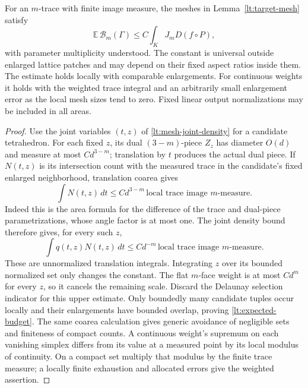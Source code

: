 \begin{lemma}
\label{lt:budget-expectation}
For an $m$-trace with finite image measure, the meshes in
Lemma~\ref{lt:target-mesh} satisfy
\begin{equation}
 \mathbb E\,\mathcal B_m(\Gamma)
             \leq C\int_K J_mD(f\circ P),
 \label{lt:expected-budget}
\end{equation}
with parameter multiplicity understood.  The constant is universal
outside enlarged lattice patches and may depend on their fixed
aspect ratios inside them.  The estimate holds locally with
comparable enlargements.  For continuous weights it holds with
the weighted trace integral and an arbitrarily small enlargement
error as the local mesh sizes tend to zero.  Fixed linear output
normalizations may be included in all areas.
\end{lemma}

\begin{proof}
Use the joint variables $(t,z)$ of
\eqref{lt:mesh-joint-density} for a candidate tetrahedron.
For each fixed $z$, its dual $(3-m)$-piece $Z_z$ has diameter
$O(d)$ and measure at most $Cd^{3-m}$; translation by $t$
produces the actual dual piece.  If $N(t,z)$ is its intersection
count with the measured trace in the candidate's fixed enlarged
neighborhood, translation coarea gives
\[
 \int N(t,z)\,dt
 \leq C d^{3-m}\,
          \text{local trace image $m$-measure}.
\]
Indeed this is the area formula for the difference of the trace
and dual-piece parametrizations, whose angle factor is at most one.
The joint density bound therefore gives, for every such $z$,
\[
 \int q(t,z)N(t,z)\,dt
 \leq C d^{-m}\,
          \text{local trace image $m$-measure}.
\]
These are unnormalized translation integrals.  Integrating $z$
over its bounded normalized set only changes the constant.
The flat $m$-face weight is at most $Cd^m$ for every $z$, so it
cancels the remaining scale.  Discard the Delaunay selection
indicator for this upper estimate.
Only boundedly many candidate tuples occur locally and their
enlargements have bounded overlap, proving
\eqref{lt:expected-budget}.  The same coarea calculation gives
generic avoidance of negligible sets and finiteness of compact
counts.  A continuous weight's supremum on each vanishing simplex
differs from its value at a measured point by its local modulus
of continuity.  On a compact set multiply that modulus by the
finite trace measure; a locally finite exhaustion and allocated
errors give the weighted assertion.
\end{proof}

